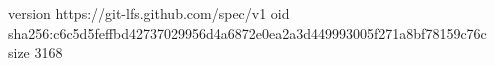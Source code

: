 version https://git-lfs.github.com/spec/v1
oid sha256:c6c5d5feffbd42737029956d4a6872e0ea2a3d449993005f271a8bf78159c76c
size 3168
